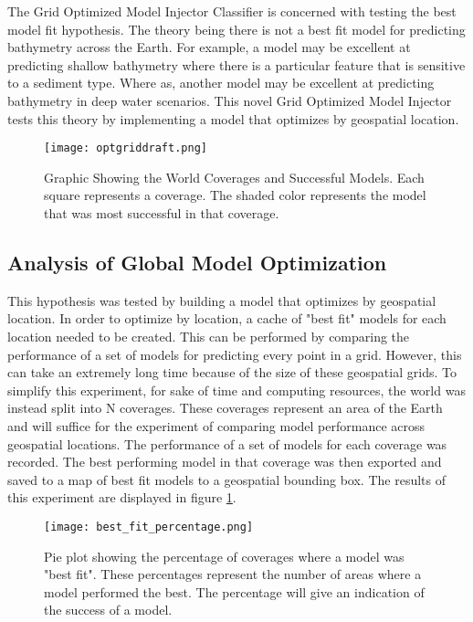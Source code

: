 The Grid Optimized Model Injector Classifier is concerned with testing the best model fit hypothesis.
The theory being there is not a best fit model for predicting bathymetry across the Earth.
For example, a model may be excellent at predicting shallow bathymetry where there is a particular feature that is sensitive to a sediment type.
Where as, another model may be excellent at predicting bathymetry in deep water scenarios.
This novel Grid Optimized Model Injector tests this theory by implementing a model that optimizes by geospatial location.

\begin{figure}[htp]
    \centering
    \texttt{[image: optgriddraft.png]}
    \caption{Graphic Showing the World Coverages and Successful Models.
    Each square represents a coverage.
    The shaded color represents the model that was most successful in that coverage.}
    \label{fig:coveragegrid}
\end{figure}

\subsection{Analysis of Global Model Optimization}
This hypothesis was tested by building a model that optimizes by geospatial location.
In order to optimize by location, a cache of "best fit" models for each location needed to be created.
This can be performed by comparing the performance of a set of models for predicting every point in a grid.
However, this can take an extremely long time because of the size of these geospatial grids.
To simplify this experiment, for sake of time and computing resources, the world was instead split into N coverages.
These coverages represent an area of the Earth and will suffice for the experiment of comparing model performance across geospatial locations.
The performance of a set of models for each coverage was recorded.
The best performing model in that coverage was then exported and saved to a map of best fit models to a geospatial bounding box.
The results of this experiment are displayed in figure \ref{fig:coveragegrid}.

\begin{figure}[htp]
    \centering
    \texttt{[image: best\_fit\_percentage.png]}
    \caption{Pie plot showing the percentage of coverages where a model was "best fit". These percentages represent the number of areas where a model performed the best. 
    The percentage will give an indication of the success of a model.}
    \label{fig:pie_best_fit}
\end{figure}

